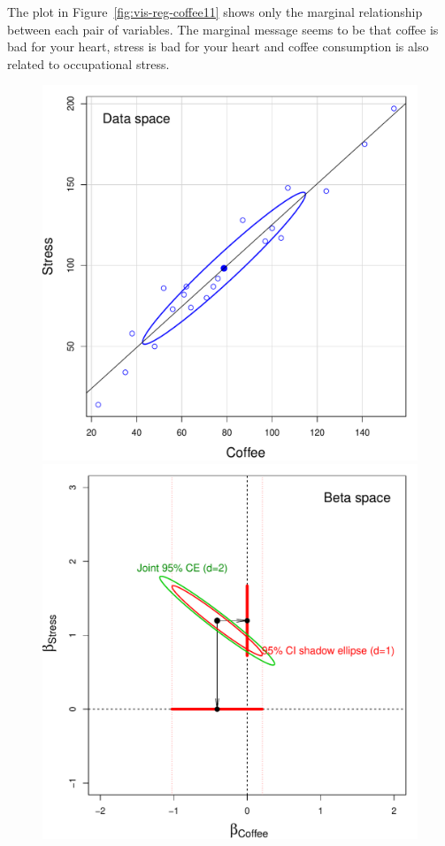 \documentclass[11pt]{article}%
\newcommand*{\figref}[1]{Figure~\ref{#1}}
\begin{document}
The plot in \figref{fig:vis-reg-coffee11} shows only the marginal relationship
between each pair of variables. The marginal message seems to be that coffee is
bad for your heart, stress is bad for your heart and coffee consumption is
also related to occupational stress.
\begin{figure}[htb]
  \begin{minipage}[c]{.485\textwidth}
   \includegraphics[width=1\linewidth,clip]{fig/vis-reg-coffee12a}
   \end{minipage}%
  \hfill
  \begin{minipage}[c]{.485\textwidth}
   \includegraphics[width=1\linewidth,clip]{fig/vis-reg-coffee12b}

\end{minipage}
\end{figure}
\end{document}
